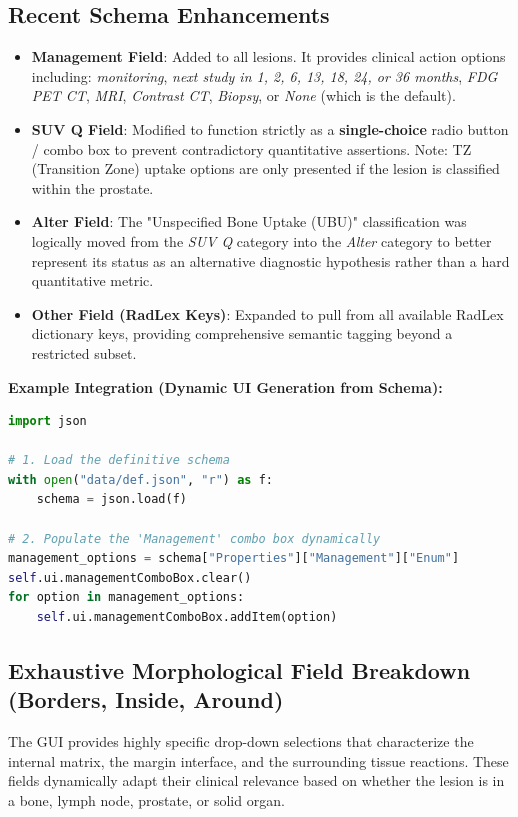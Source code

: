 \documentclass[a4paper,10pt]{article}
\begin{document}
\subsection{Recent Schema Enhancements}
\begin{itemize}
    \item \textbf{Management Field}: Added to all lesions. It provides clinical action options including: \textit{monitoring}, \textit{next study in 1, 2, 6, 13, 18, 24, or 36 months}, \textit{FDG PET CT}, \textit{MRI}, \textit{Contrast CT}, \textit{Biopsy}, or \textit{None} (which is the default).
    \item \textbf{SUV Q Field}: Modified to function strictly as a \textbf{single-choice} radio button / combo box to prevent contradictory quantitative assertions. Note: TZ (Transition Zone) uptake options are only presented if the lesion is classified within the prostate.
    \item \textbf{Alter Field}: The "Unspecified Bone Uptake (UBU)" classification was logically moved from the \textit{SUV Q} category into the \textit{Alter} category to better represent its status as an alternative diagnostic hypothesis rather than a hard quantitative metric.
    \item \textbf{Other Field (RadLex Keys)}: Expanded to pull from all available RadLex dictionary keys, providing comprehensive semantic tagging beyond a restricted subset.
\end{itemize}

\textbf{Example Integration (Dynamic UI Generation from Schema):}
\begin{lstlisting}[language=Python]
import json

# 1. Load the definitive schema
with open("data/def.json", "r") as f:
    schema = json.load(f)

# 2. Populate the 'Management' combo box dynamically
management_options = schema["Properties"]["Management"]["Enum"]
self.ui.managementComboBox.clear()
for option in management_options:
    self.ui.managementComboBox.addItem(option)
\end{lstlisting}

\subsection{Exhaustive Morphological Field Breakdown (Borders, Inside, Around)}
The GUI provides highly specific drop-down selections that characterize the internal matrix, the margin interface, and the surrounding tissue reactions. These fields dynamically adapt their clinical relevance based on whether the lesion is in a bone, lymph node, prostate, or solid organ.
\end{document}
